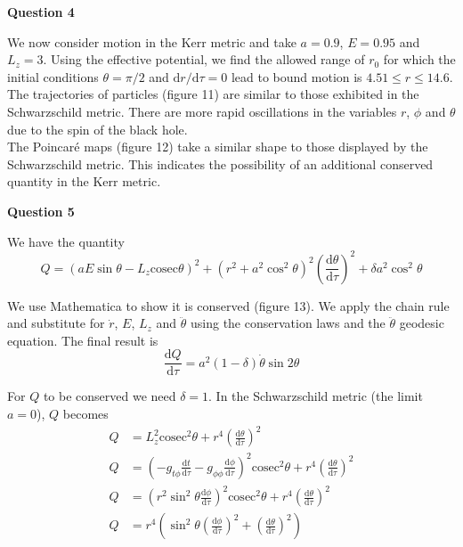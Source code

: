 \documentclass[12pt]{extarticle}
\begin{document}
\begin{center}
\textbf{Question 4}
\end{center}

We now consider motion in the Kerr metric and take $a = 0.9$, $E = 0.95$ and $L_z = 3$. Using the effective potential, we find the allowed range of $r_0$ for which the initial conditions $\theta = \pi/2$ and $\mathrm{d}r/\mathrm{d}\tau = 0$ lead to bound motion is $4.51 \leq r \leq 14.6$.\\

The trajectories of particles (figure 11) are similar to those exhibited in the Schwarzschild metric. There are more rapid oscillations in the variables $r$, $\phi$ and $\theta$ due to the spin of the black hole. \\

The Poincar\'e maps (figure 12) take a similar shape to those displayed by the Schwarzschild metric. This indicates the possibility of an additional conserved quantity in the Kerr metric.\\

\begin{center}
\textbf{Question 5}
\end{center}

We have the quantity 
$$Q = (aE\sin\theta - L_z \mathrm{cosec}\theta)^2+(r^2+a^2\cos^2\theta)^2\left(\frac{\mathrm{d}\theta}{\mathrm{d}\tau}\right)^2+\delta a^2 \cos^2\theta$$

We use Mathematica to show it is conserved (figure 13). We apply the chain rule and substitute for $\dot{r}$, $E$, $L_z$ and $\ddot{\theta}$ using the conservation laws and the $\ddot{\theta}$ geodesic equation. The final result is 
$$\frac{\mathrm{d}Q}{\mathrm{d}\tau} = a^2(1-\delta)\dot{\theta}\sin2\theta$$
  
For $Q$ to be conserved we need $\delta = 1$. In the Schwarzschild metric (the limit $a=0$), $Q$ becomes
\begin{align*}
Q &= L_z^2 \mathrm{cosec}^2\theta+r^4\left(\frac{\mathrm{d}\theta}{\mathrm{d}\tau}\right)^2 \\
Q &= \left(-g_{t\phi}\frac{\mathrm{d}t}{\mathrm{d}\tau}-g_{\phi \phi}\frac{\mathrm{d}\phi}{\mathrm{d}\tau}\right)^2\mathrm{cosec}^2\theta+r^4\left(\frac{\mathrm{d}\theta}{\mathrm{d}\tau}\right)^2\\
Q &= \left(r^2\sin^2\theta\frac{\mathrm{d}\phi}{\mathrm{d}\tau}\right)^2\mathrm{cosec}^2\theta+r^4\left(\frac{\mathrm{d}\theta}{\mathrm{d}\tau}\right)^2\\
Q &= r^4\left( \sin^2\theta \left(\frac{\mathrm{d}\phi}{\mathrm{d}\tau}\right)^2+\left(\frac{\mathrm{d}\theta}{\mathrm{d}\tau}\right)^2\right)
\end{align*}
\end{document}
